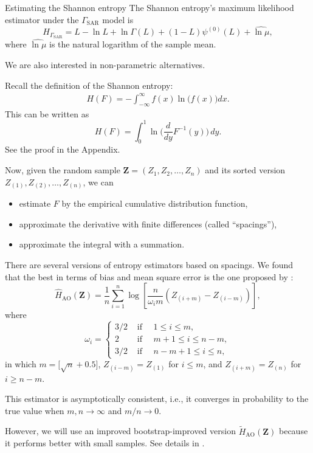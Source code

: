 \documentclass[table,aspectratio=169]{beamer}
\begin{document}
\begin{frame}[allowframebreaks]{Estimating the Shannon entropy}
The Shannon entropy's maximum likelihood estimator under the $\Gamma_{\text{SAR}}$ model is
$$
\widehat{H_{\Gamma_{\text{SAR}}}} = L -\ln L+\ln\Gamma(L)+(1-L)\psi^{(0)}(L) + \widehat{\ln \mu},
$$
where $\widehat{\ln \mu}$ is the natural logarithm of the sample mean.

We are also interested in non-parametric alternatives.

Recall the definition of the Shannon entropy:
\begin{align*}
	H(F) = -\int_{-\infty}^\infty f(x) \ln\big(f(x)\big) dx.
\end{align*}
This can be written as
$$
H(F) = \int_{0}^{1} \ln \Big( \frac{d}{dy} F^{-1}(y) \Big) \, dy.
$$
See the proof in the Appendix.

Now, given the random sample $\bm Z=(Z_1,Z_2,\dots,Z_n)$ and its sorted version $Z_{(1)},Z_{(2)},\dots,Z_{(n)}$, we can 
\begin{itemize}
	\item estimate $F$ by the empirical cumulative distribution function,
	\item approximate the derivative with finite differences (called ``spacings''),
	\item approximate the integral with a summation.
\end{itemize}

There are several versions of entropy estimators based on spacings.
We found that the best in terms of bias and mean square error is the one proposed by
\citet{IbrahimAlOmari2014}:
 \[
	\widehat{H}_{\text{AO}}(\bm{Z})=\frac{1}{n} \sum_{i=1}^n \log \left[\frac{n}{\omega_i m}\left(Z_{(i+m)}-Z_{(i-m)}\right)\right],
	\] where \[
	\omega_i= \begin{cases}3/2 & \text { if }\quad 1 \leq i \leq m, \\ 2 & \text { if }\quad m+1 \leq i \leq n-m, \\ 3/2 & \text { if } \quad n-m+1 \leq i \leq n,\end{cases}
	\] 
	in which \(m=\big[\sqrt{n}+0.5\big]\), \(Z_{(i-m)}=Z_{(1)}\) for \(i \leq m\), and
	\(Z_{(i+m)}=Z_{(n)}\) for \(i \geq n-m\).

This estimator is asymptotically consistent, i.e., it converges in
probability to the true value when \(m,n\rightarrow\infty\) and
\(m/n\rightarrow0\). 

However, we will use an improved bootstrap-improved
version $\widetilde{H}_{\text{AO}}(\bm Z)$ because it performs better with small samples.
See details in \citet{IdentifyingHeterogeneityinSARDatawithNewTestStatistics}.
\end{frame}
\end{document}
